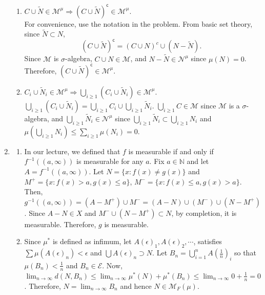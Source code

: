 \documentclass{article}
\begin{document}
\begin{enumerate}[font = \Large\bfseries\itshape\space, leftmargin = 3mm, labelsep = 3mm]
\begin{enumerate}[label=(\roman*)]
\item
$C \cup \widetilde{N} \in \mathcal{M}^\mu \Rightarrow (C \cup \widetilde{N})^\mathsf{c} \in \mathcal{M}^\mu$.\\
For convenience, use the notation in the problem.
From basic set theory, since $\widetilde{N} \subset N$,
$$
(C \cup \widetilde{N})^\mathsf{c} = (C \cup N)^c \cup (N - \widetilde{N}).
$$
Since $\mathcal{M}$ is $\sigma$-algebra, $C \cup N \in \mathcal{M}$, and $N  - \widetilde{N} \in \mathcal{N}^\mu$ since $\mu(N) = 0$.
Therefore, $(C \cup \widetilde{N})^\mathsf{c} \in \mathcal{M}^\mu$.

\item
$C_i \cup \widetilde{N}_i \in \mathcal{M}^\mu \Rightarrow \bigcup_{i\geq 1} (C_i \cup \widetilde{N}_i) \in \mathcal{M}^\mu$.\\
$\bigcup_{i\geq 1} (C_i \cup \widetilde{N}_i) = \bigcup_{i\geq 1} C_i \cup \bigcup_{i\geq 1} \widetilde{N}_i$.
$\bigcup_{i\geq 1}C \in \mathcal{M}$ since $\mathcal{M}$ is a $\sigma$-algebra, and $\bigcup_{i\geq 1}\widetilde{N}_i \in \mathcal{N}^\mu$ since $\bigcup_{i\geq 1} \widetilde{N}_i \subset \bigcup_{i\geq 1} N_i$ and $\mu(\bigcup_{i\geq 1} N_i) \leq \sum_{i\geq 1} \mu(N_i) = 0$.

\end{enumerate}

\item
\begin{enumerate}[label=(\roman*)]
\item
In our lecture, we defined that $f$ is measurable if and only if $f^{-1}((a,\infty))$ is measurable for any $a$.
Fix $a \in \mathbb{N}$ and let $A = f^{-1}((a,\infty))$.
Let $N = \{ x : f(x) \neq g(x) \}$ and $M^+ = \{ x : f(x) > a, g(x) \leq a\}$, $M^- = \{ x : f(x) \leq a, g(x) > a\}$.
Then, $g^{-1}((a,\infty)) = (A - M^+) \cup M^- = (A-N) \cup (M^-) \cup (N - M^+)$.
Since $A - N \in X$ and $M^- \cup (N - M^+) \subset N$, by completion, it is measurable.
Therefore, $g$ is measurable.

\item
Since $\mu^*$ is defined as infimum, let $A(\epsilon)_1, A(\epsilon)_2, \cdots$, satisfies $\sum \mu(A(\epsilon)_n) < \epsilon$ and $\bigcup A(\epsilon)_n \supset N$.
Let $B_n = \bigcup_{i = 1}^n A(\frac{1}{n})_i$ so that $\mu(B_n) < \frac{1}{n}$ and $B_n \in \mathcal{E}$.
Now, $\lim_{n\rightarrow\infty} d(N, B_n) \leq \lim_{n\rightarrow\infty} \mu^*(N) + \mu^*(B_n) \leq \lim_{n\rightarrow\infty} 0 + \frac{1}{n} = 0$.
Therefore, $N = \lim_{n\rightarrow\infty} B_n$ and hence $N \in \mathcal{M}_F(\mu)$.
\end{enumerate}

\end{enumerate}
\end{document}

